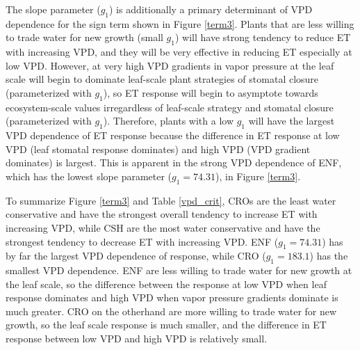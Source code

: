 \documentclass[draft,linenumbers]{agujournal}
\begin{document}
The slope parameter ($g_1$) is additionally a primary determinant of VPD  dependence for the sign term shown in Figure \ref{term3}. Plants that are less willing to trade water for new growth (small $g_1$) will have strong tendency to reduce ET with increasing VPD, and they will be very effective in reducing ET especially at low VPD.  However, at very high VPD gradients in vapor pressure at the leaf scale will begin to dominate leaf-scale plant strategies of stomatal closure (parameterized with $g_1$), so ET response will begin to asymptote towards ecosystem-scale values irregardless of leaf-scale strategy and stomatal closure (parameterized with $g_1$). Therefore, plants with a low $g_1$ will have the largest VPD dependence of ET response because the difference in ET response at low VPD (leaf stomatal response dominates) and high VPD (VPD gradient dominates) is largest. This is apparent in the strong VPD dependence of ENF, which has the lowest slope parameter ($g_1=74.31$), in Figure \ref{term3}.  

To summarize Figure \ref{term3} and Table \ref{vpd_crit}, CROs are the least water conservative and have the strongest overall tendency to increase ET with increasing VPD, while CSH are the most water conservative and have the strongest tendency to decrease ET with increasing VPD.  ENF ($g_1 = 74.31$) has by far the largest VPD dependence of response, while CRO ($g_1 = 183.1$) has the smallest VPD dependence.  ENF are less willing to trade water for new growth at the leaf scale, so the difference between the response at low VPD when leaf response dominates and high VPD when vapor pressure gradients dominate is much greater. CRO on the otherhand are more willing to trade water for new growth, so the leaf scale response is much smaller, and the difference in ET response between low VPD and high VPD is relatively small.
\end{document}
